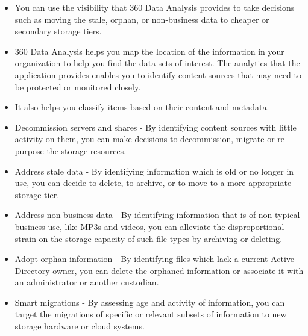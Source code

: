 \documentclass[letterpaper,10pt,english]{sphinxmanual}
\begin{document}
\begin{itemize}
\item {} 
You can use the visibility that 360 Data Analysis provides to take decisions such as moving the stale, orphan, or non-business data to cheaper or secondary storage tiers.

\end{itemize}

\begin{itemize}
\item {} 
360 Data Analysis helps you map the location of the information in your organization to help you find the data sets of interest. The analytics that the application provides enables you to identify content sources that may need to be protected or monitored closely.

\item {} 
It also helps you classify items based on their content and metadata.

\end{itemize}

\begin{itemize}
\item {} 
Decommission servers and shares - By identifying content sources with little activity on them, you can make decisions to decommission, migrate or re-purpose the storage resources.

\item {} 
Address stale data - By identifying information which is old or no longer in use, you can decide to delete, to archive, or to move to a more appropriate storage tier.

\item {} 
Address non-business data - By identifying information that is of non-typical business use, like MP3s and videos, you can alleviate the disproportional strain on the storage capacity of such file types by archiving or deleting.

\item {} 
Adopt orphan information - By identifying files which lack a current Active Directory owner, you can delete the orphaned information or associate it with an administrator or another custodian.

\item {} 
Smart migrations - By assessing age and activity of information, you can target the migrations of specific or relevant subsets of information to new storage hardware or cloud systems.

\end{itemize}
\end{document}
